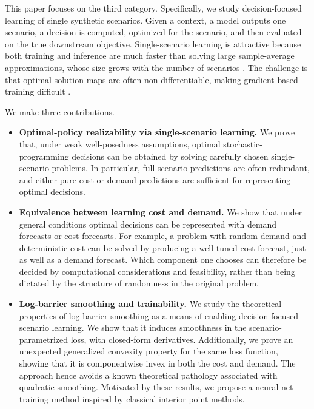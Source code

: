 \documentclass{article}
\newcommand{\1}{\mathbf{1}}
\theoremstyle{plain}
\theoremstyle{definition}
\theoremstyle{remark}
\begin{document}
This paper focuses on the third category. Specifically, we study decision-focused learning of single synthetic scenarios. Given a context, a model outputs one scenario, a decision is computed, optimized for the scenario, and then evaluated on the true downstream objective. Single-scenario learning is attractive because both training and inference are much faster than solving large sample-average approximations, whose size grows with the number of scenarios \citep{shapiro2014lectures}. The challenge is that optimal-solution maps are often non-differentiable, making gradient-based training difficult \citep{wilder2019melding,mandi2020interior}.

We make three contributions.

\begin{itemize}
    \item \textbf{Optimal-policy realizability via single-scenario learning.}
    We prove that, under weak well-posedness assumptions, optimal stochastic-programming decisions can be obtained by solving carefully chosen single-scenario problems. In particular, full-scenario predictions are often redundant, and either pure cost or demand predictions are sufficient for representing optimal decisions.

    \item \textbf{Equivalence between learning cost and demand.}
    We show that under general conditions optimal decisions can be represented with demand forecasts or cost forecasts. For example, a problem with random demand and deterministic cost can be solved by producing a well-tuned cost forecast, just as well as a demand forecast. Which component one chooses can therefore be decided by computational considerations and feasibility, rather than being dictated by the structure of randomness in the original problem.

    \item \textbf{Log-barrier smoothing and trainability.}
    We study the theoretical properties of log-barrier smoothing as a means of enabling decision-focused scenario learning. We show that it induces smoothness in the scenario-parametrized loss, with closed-form derivatives. Additionally, we prove an unexpected generalized convexity property for the same loss function, showing that it is componentwise invex in both the cost and demand. The approach hence avoids a known theoretical pathology associated with quadratic smoothing. Motivated by these results, we propose a neural net training method inspired by classical interior point methods.

\end{itemize}
\end{document}
